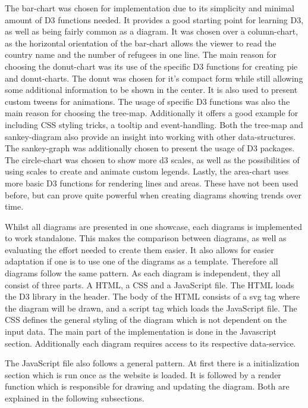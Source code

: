 The bar-chart was chosen for implementation due to its simplicity and minimal amount of D3 functions needed. It provides a good starting point for learning D3, as well as being fairly common as a diagram. It was chosen over a column-chart, as the horizontal orientation of the bar-chart allows the viewer to read the country name and the number of refugees in one line.
The main reason for choosing the donut-chart was its use of the specific D3 functions for creating pie and donut-charts. The donut was chosen for it's compact form while still allowing some additional information to be shown in the center. It is also used to present custom tweens for animations.
The usage of specific D3 functions was also the main reason for choosing the tree-map. Additionally it offers a good example for including CSS styling tricks, a tooltip and event-handling.
Both the tree-map and sankey-diagram also provide an insight into working with other data-structures. The sankey-graph was additionally chosen to present the usage of D3 packages.
The circle-chart was chosen to show more d3 scales, as well as the possibilities of using scales to create and animate custom legends.
Lastly, the area-chart uses more basic D3 functions for rendering lines and areas. These have not been used before, but can prove quite powerful when creating diagrams showing trends over time.


Whilst all diagrams are presented in one showcase, each diagrams is implemented to work standalone. This makes the comparison between diagrams, as well as evaluating the effort needed to create them easier. It also allows for easier adaptation if one is to use one of the diagrams as a template. Therefore all diagrams follow the same pattern. As each diagram is independent, they all consist of three parts. A HTML, a CSS and a JavaScript file. The HTML loads the D3 library in the header. The body of the HTML consists of a svg tag where the diagram will be drawn, and a script tag which loads the JavaScript file. The CSS defines the general styling of the diagram which is not dependent on the input data. The main part of the implementation is done in the Javascript section. Additionally each diagram requires access to its respective data-service.

The JavaScript file also follows a general pattern. At first there is a initialization section which is run once as the website is loaded. It is followed by a render function which is responsible for drawing and updating the diagram. Both are explained in the following subsections.


